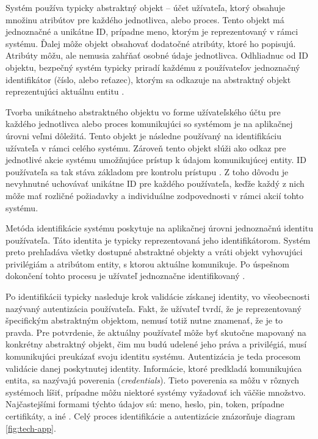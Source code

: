 \documentclass[
  printed, %
  table,   %
  lof,     %
  nolot,   %
  nocover
]{fithesis3}
\begin{document}
Systém používa typicky
abstraktný objekt -- účet užívateľa, ktorý obsahuje množinu atribútov pre
každého jednotlivca, alebo proces. Tento objekt má jednoznačné a unikátne
ID, prípadne meno, ktorým je reprezentovaný v rámci systému. Ďalej môže objekt
obsahovať dodatočné atribúty, ktoré ho popisujú. Atribúty môžu, ale nemusia
zahŕňať osobné údaje jednotlivca. Odhliadnuc od ID objektu, bezpečný systém
typicky priradí každému z používateľov jednoznačný identifikátor (číslo, alebo
reťazec), ktorým sa odkazuje na abstraktný objekt reprezentujúci aktuálnu
entitu \cite{Todorov:2007:EX}. 

Tvorba unikátneho abstraktného objektu vo forme užívateľského účtu
pre každého jednotlivca alebo proces komunikujúci so systémom je na aplikačnej
úrovni veľmi dôležitá. Tento objekt je následne používaný na identifikáciu
užívateľa v rámci celého systému. Zároveň tento objekt slúži ako odkaz pre
jednotlivé akcie systému umožňujúce prístup k údajom komunikujúcej entity.
ID používateľa sa tak stáva základom pre kontrolu prístupu \cite{Todorov:2007:EX}. Z toho dôvodu je 
nevyhnutné uchovávať unikátne ID pre každého používateľa, keďže každý z nich
môže mať rozličné požiadavky a individuálne zodpovednosti v rámci akcií tohto
systému.

Metóda identifikácie systému poskytuje na aplikačnej úrovni jednoznačnú
identitu používateľa. Táto identita je typicky reprezentovaná jeho
identifikátorom. Systém preto prehľadáva všetky dostupné abstraktné objekty a
vráti objekt vyhovujúci privilégiám a atribútom entity, s ktorou aktuálne
komunikuje. Po úspešnom dokončení tohto procesu je užívateľ jednoznačne
identifikovaný \cite{Todorov:2007:EX}.

Po identifikácii typicky nasleduje krok validácie získanej identity,
vo všeobecnosti nazývaný autentizácia používateľa. Fakt, že užívateľ tvrdí,
že je reprezentovaný špecifickým abstraktným objektom, nemusí totiž nutne
znamenať, že je to pravda. Pre potvrdenie, že aktuálny používateľ môže byť
skutočne mapovaný na konkrétny abstraktný objekt, čim mu budú udelené jeho
práva a privilégiá, musí komunikujúci preukázať svoju identitu systému.
Autentizácia je teda procesom validácie danej poskytnutej identity. Informácie,
ktoré predkladá komunikujúca entita, sa nazývajú poverenia
(\textit{credentials}). Tieto poverenia sa môžu v rôznych systémoch líšiť, 
prípadne môžu niektoré systémy vyžadovať ich väčšie množstvo. Najčastejšími
formami týchto údajov sú: meno, heslo, pin, token, prípadne certifikáty, a iné \cite{Todorov:2007:EX}.
Celý proces identifikácie a autentizácie znázorňuje diagram \ref{fig:tech-app}.
\end{document}
